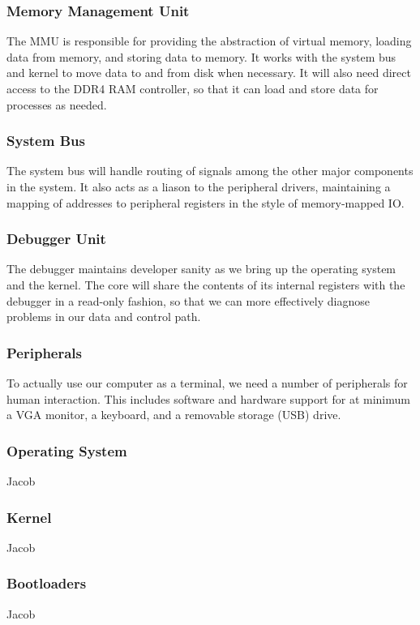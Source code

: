 \documentclass{article}
\begin{document}
    \subsubsection{Memory Management Unit}
    The MMU is responsible for providing the abstraction of virtual memory, loading data from memory, and storing data to memory.  It works with the system bus and kernel to move data to and from disk when necessary.  It will also need direct access to the DDR4 RAM controller, so that it can load and store data for processes as needed.
    
    \subsubsection{System Bus}
    The system bus will handle routing of signals among the other major components in the system.  It also acts as a liason to the peripheral drivers, maintaining a mapping of addresses to peripheral registers in the style of memory-mapped IO.
    
    \subsubsection{Debugger Unit}
    The debugger maintains developer sanity as we bring up the operating system and the kernel.  The core will share the contents of its internal registers with the debugger in a read-only fashion, so that we can more effectively diagnose problems in our data and control path.

    \subsubsection{Peripherals}
    To actually use our computer as a terminal, we need a number of peripherals for human interaction.  This includes software and hardware support for at minimum a VGA monitor, a keyboard, and a removable storage (USB) drive.
    
    \subsubsection{Operating System}
    Jacob
    
    \subsubsection{Kernel}
    Jacob

    \subsubsection{Bootloaders}
    Jacob
\end{document}
